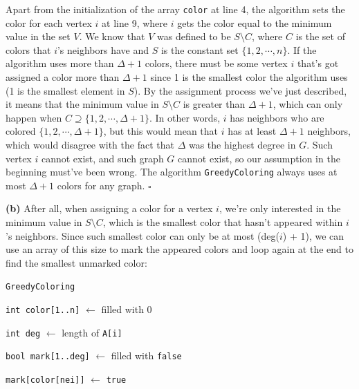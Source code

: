 \documentclass{article}
\begin{document}
\begin{enumerate}
    Apart from the initialization of the array \texttt{color} at line 4, the algorithm sets the color for each vertex $i$ at line 9, where $i$ gets the color equal to the minimum value in the set $V$. We know that $V$ was defined to be $S \setminus C$, where $C$ is the set of colors that $i$'s neighbors have and $S$ is the constant set $\{1, 2, \cdots, n\}$. If the algorithm uses more than $\Delta + 1$ colors, there must be some vertex $i$ that's got assigned a color more than $\Delta + 1$ since 1 is the smallest color the algorithm uses (1 is the smallest element in $S$). By the assignment process we've just described, it means that the minimum value in $S \setminus C$ is greater than $\Delta + 1$, which can only happen when $C \supseteq \{1, 2, \cdots, \Delta + 1\}$. In other words, $i$ has neighbors who are colored $\{1, 2, \cdots, \Delta + 1\}$, but this would mean that $i$ has at least $\Delta + 1$ neighbors, which would disagree with the fact that $\Delta$ was the highest degree in $G$. Such vertex $i$ cannot exist, and such graph $G$ cannot exist, so our assumption in the beginning must've been wrong. The algorithm \texttt{GreedyColoring} always uses at most $\Delta + 1$ colors for any graph. $\square$

    \textbf{(b)} After all, when assigning a color for a vertex $i$, we're only interested in the minimum value in $S \setminus C$, which is the smallest color that hasn't appeared within $i$'s neighbors. Since such smallest color can only be at most (deg($i$) + 1), we can use an array of this size to mark the appeared colors and loop again at the end to find the smallest unmarked color:
    \begin{center}
      \begin{minipage}{0.5625\linewidth}
        \renewcommand{\thealgocf}{}
        \begin{algorithm}[H]
          \caption{\texttt{GreedyColoring}}

          {\tt int color[1..n]} $\gets$ filled with 0

          \setcounter{AlgoLine}{5}

          {
            {\tt int deg} $\gets$ length of {\tt A[i]}

              {\tt bool mark[1..deg]} $\gets$ filled with {\tt false}

            {
              {
                {\tt mark[color[nei]]} $\gets$ {\tt true}
              }
            }

}
\end{algorithm}
\end{minipage}
\end{center}
\end{enumerate}
\end{document}
